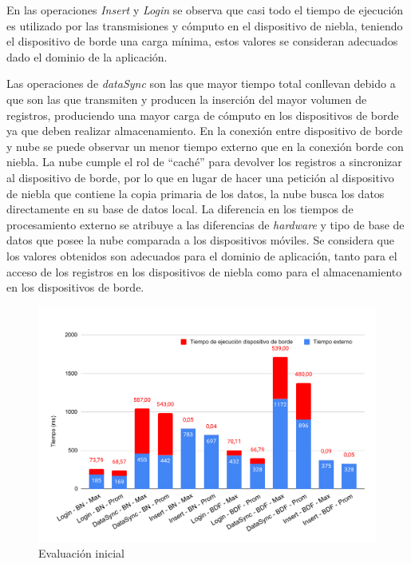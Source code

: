 En las operaciones \textit{Insert} y \textit{Login} se observa que casi todo el tiempo de ejecución es utilizado por las transmisiones y cómputo en el dispositivo de niebla, teniendo el dispositivo de borde una carga mínima, estos valores se consideran adecuados dado el dominio de la aplicación. 

Las operaciones de \textit{dataSync} son las que mayor tiempo total conllevan debido a que son las que transmiten y producen la inserción del mayor volumen de registros, produciendo una mayor carga de cómputo en los dispositivos de borde ya que deben realizar almacenamiento. En la conexión entre dispositivo de borde y nube se puede observar un menor tiempo externo que en la conexión borde con niebla. La nube cumple el rol de ``caché'' para devolver los registros a sincronizar al dispositivo de borde, por lo que en lugar de hacer una petición al dispositivo de niebla que contiene la copia primaria de los datos, la nube busca los datos directamente en su base de datos local. La diferencia en los tiempos de procesamiento externo se atribuye a las diferencias de \textit{hardware} y tipo de base de datos que posee la nube comparada a los dispositivos móviles. Se considera que los valores obtenidos son adecuados para el dominio de aplicación, tanto para el acceso de los registros en los dispositivos de niebla como para el almacenamiento en los dispositivos de borde.


\begin{figure}
    \centering 
        \includegraphics[width=\textwidth]{Imagenes/Experimentos/experimentoBarrasOperaciones.pdf}
        \caption{Evaluación inicial}
        \label{fig:evaluacionInicial}
\end{figure}

